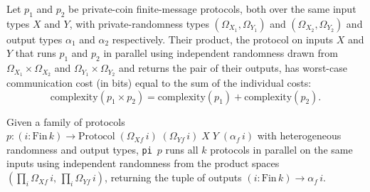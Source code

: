 \begin{theorem}
\label{CommunicationComplexity.PrivateCoin.FiniteMessage.Protocol.prod_complexity}
\leanok
{}
Let $p_1$ and $p_2$ be private-coin finite-message protocols, both over the same input
types $X$ and $Y$, with private-randomness types $(\Omega_{X_1}, \Omega_{Y_1})$ and
$(\Omega_{X_2}, \Omega_{Y_2})$ and output types $\alpha_1$ and $\alpha_2$ respectively.
Their product, the protocol on inputs $X$ and $Y$ that runs $p_1$ and $p_2$ in parallel
using independent randomness drawn from $\Omega_{X_1} \times \Omega_{X_2}$ and
$\Omega_{Y_1} \times \Omega_{Y_2}$ and returns the pair of their outputs, has worst-case
communication cost (in bits) equal to the sum of the individual costs:
\[
\mathrm{complexity}(p_1 \times p_2) = \mathrm{complexity}(p_1) +
\mathrm{complexity}(p_2).
\]
\end{theorem}

\begin{definition}
\label{CommunicationComplexity.PrivateCoin.FiniteMessage.Protocol.pi}
\leanok
{}
Given a family of protocols $p : (i : \mathrm{Fin}\,k) \to \mathrm{Protocol}\;(\Omega_{Xf}\,i)\;(\Omega_{Yf}\,i)\;X\;Y\;(\alpha_f\,i)$
with heterogeneous randomness and output types, \texttt{pi}~$p$ runs all $k$ protocols
in parallel on the same inputs using independent randomness from the product spaces
$(\prod_i \Omega_{Xf}\,i,\, \prod_i \Omega_{Yf}\,i)$, returning the tuple of outputs
$(i : \mathrm{Fin}\,k) \to \alpha_f\,i$.
\end{definition}

